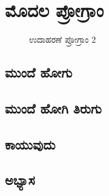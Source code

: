 \chapter{ಮೊದಲ ಪ್ರೋಗ್ರಾಂ}
\begin{figure}[h]
\begin{Scratch}[1]
\beginbox{}
\end{Scratch}
\caption{ಉದಾಹರಣೆ ಪ್ರೋಗ್ರಾಂ 2}
\end{figure}


\section{ಮುಂದೆ ಹೋಗು}

\section{ಮುಂದೆ ಹೋಗಿ ತಿರುಗು}

\section{ಕಾಯುವುದು}

\section{ಅಭ್ಯಾಸ }